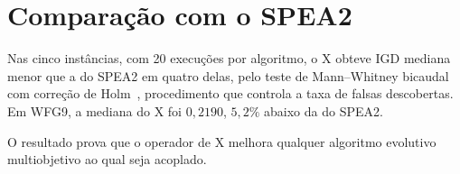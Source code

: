 \section{Comparação com o SPEA2}
\label{sec:fixture_gate}

Nas cinco instâncias, com 20 execuções por algoritmo, o X obteve IGD mediana menor que a do SPEA2 em quatro delas, pelo teste de Mann--Whitney bicaudal com correção de Holm~\cite{holm1979simple}, procedimento que controla a taxa de falsas descobertas. Em WFG9, a mediana do X foi $0{,}2190$, $5{,}2\%$ abaixo da do SPEA2.

O resultado prova que o operador de X melhora qualquer algoritmo evolutivo multiobjetivo ao qual seja acoplado.
